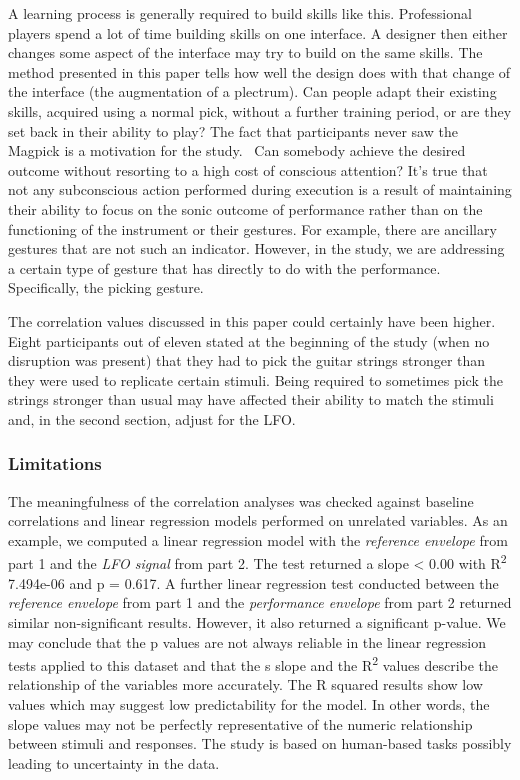 \documentclass[sigconf]{nimeart}
\begin{document}
A learning process is generally required to build skills like this. Professional players spend a lot of time building skills on one interface. A designer then either changes some aspect of the interface may try to build on the same skills. The method presented in this paper tells how well the design does with that change of the interface (the augmentation of a plectrum). Can people adapt their existing skills, acquired using a normal pick, without a further training period, or are they set back in their ability to play? The fact that participants never saw the Magpick is a motivation for the study.~ Can somebody achieve the desired outcome without resorting to a high cost of conscious attention? It's true that not any subconscious action performed during execution is a result of maintaining their ability to focus on the sonic outcome of performance rather than on the functioning of the instrument or their gestures. For example, there are ancillary gestures that are not such an indicator. However, in the study, we are addressing a certain type of gesture that has directly to do with the performance. Specifically, the picking gesture.~

The correlation values discussed in this paper could certainly have been higher. Eight participants out of eleven stated at the beginning of the study (when no disruption was present) that they had to pick the guitar strings stronger than they were used to replicate certain stimuli. Being required to sometimes pick the strings stronger than usual may have affected their ability to match the stimuli and, in the second section, adjust for the LFO.

\subsubsection{Limitations}\label{limitations}

The meaningfulness of the correlation analyses was checked against baseline correlations and linear regression models performed on unrelated variables. As an example, we computed a linear regression model with the \emph{reference envelope} from part 1 and the \emph{LFO signal} from part 2. The test returned a slope \textless{} 0.00 with R\textsuperscript{2} 7.494e-06 and p = 0.617. A further linear regression test conducted between the \emph{reference envelope} from part 1 and the \emph{performance envelope} from part 2 returned similar non-significant results. However, it also returned a significant p-value. We may conclude that the p values are not always reliable in the linear regression tests applied to this dataset and that the s slope and the R\textsuperscript{2} values describe the relationship of the variables more accurately. The R squared results show low values which may suggest low predictability for the model. In other words, the slope values may not be perfectly representative of the numeric relationship between stimuli and responses. The study is based on human-based tasks possibly leading to uncertainty in the data.
\end{document}
